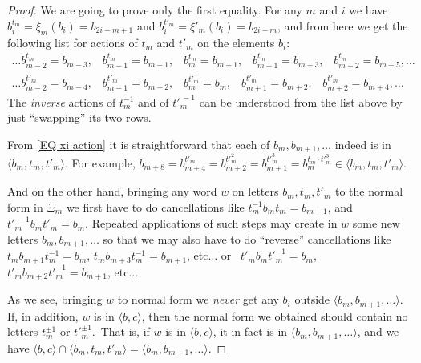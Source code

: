 \documentclass[12pt, a4paper]{amsart}
\newcommand{\1}{\{1\}}
\theoremstyle{plain}
\theoremstyle{definition}
\theoremstyle{remark}
\numberwithin{equation}{section}
\begin{document}
\begin{proof}
We are going to prove only the first equality. 
For any $m$ and $i$ we have 
$b_{i}^{t_m} = \xi_m(b_i)=b_{2i-m+1}$ and 
$b_{i}^{t'_m} = \xi'_m(b_i)=b_{2i-m}$, and from here we get the following list for actions of $t_m$ and $t'_{m}$ on the elements $b_i$:
\begin{equation}
\label{EQ xi action}
\begin{split}
\ldots
b_{m-2}^{t_m} \!=\! b_{m-3},\;\;\;
b_{m-1}^{t_m} \!=\! b_{m-1},\;\;\;
b_{m}^{t_m}   \!=\! b_{m+1},\;\;\;
b_{m+1}^{t_m} \!=\! b_{m+3},\;\;\;
b_{m+2}^{t_m} \!=\! b_{m+5},
\ldots\\
\ldots
b_{m-2}^{t'_m} \!=\! b_{m-4},\;\;\;
b_{m-1}^{t'_m} \!=\! b_{m-2},\;\;\;
b_{m}^{t'_m}   \!=\! b_{m},\;\;\;
b_{m+1}^{t'_m} \!=\! b_{m+2},\;\;\;
b_{m+2}^{t'_m} \!=\! b_{m+4},\ldots
\;\;
\end{split}
\end{equation}
The \textit{inverse} actions of $t_m^{-1}$ and of ${t'}_{\!\!\!m}^{\,-1}$ can be understood from the list above by just ``swapping'' its two rows.

From \eqref{EQ xi action} it is straightforward that each of $b_m, b_{m+1},\ldots$ indeed is in $\langle b_m, t_m, t'_m\rangle$. 
%
For example, 
$b_{m+8}
=b_{m+4}^{t'_m}
=b_{m+2}^{{t'}_{\!\!\!m}^2}
=b_{m+1}^{{t'}_{\!\!\!m}^3}
=b_{m}^{t_m \cdot {t'}_{\!\!\!m}^3}\in \langle b_m, t_m, t'_m\rangle$. 

And on the other hand, bringing any word $w$ on letters $b_m, t_m, t'_m$ to the normal form in 
$\Xi_m$
we first have to  do cancellations like $t_m^{-1} b_m t_m=b_{m+1}$, and   ${t'}_{\!\!\!m}^{\,-1} b_{m} {t'}_{\!\!\!m}=b_{m}$. Repeated applications of such steps may create in $w$ some new letters 
$b_m, b_{m+1},\ldots$ so that we may also have to do ``reverse'' cancellations like 
$t_m b_{m+1} t_m^{-1}=b_{m}$, 
\; 
$t_m b_{m+3} t_m^{-1}=b_{m+1}$, etc...
or \,
$t'_m b_m {t'}_m^{-1}=b_{m}$,
\;
$t'_m b_{m+2} {t'}_m^{-1}=b_{m+1}$, etc...

As we see, bringing $w$ to normal form we \textit{never} get any $b_i$ outside $\langle b_m, b_{m+1},\ldots\rangle$. If, in addition, $w$ is in $\langle b,c \rangle$, then the normal form we obtained should contain no letters 
$t_m^{\pm 1}$ or ${t'}_{\!\!\!m}^{\pm 1}$\!.\,
That is, if $w$ is in $\langle b,c \rangle$, it in fact is in $\langle b_m, b_{m+1},\ldots\rangle$, and we have $\langle b,c \rangle \cap \langle b_m, t_m, t'_m\rangle = \langle b_m, b_{m+1},\ldots\rangle$.
\end{proof}
\end{document}

